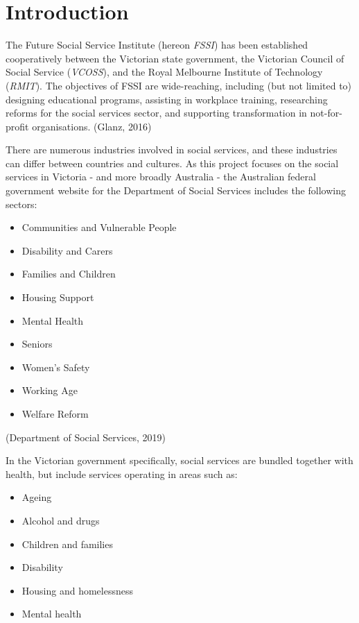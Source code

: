 \documentclass[
  11pt,
]{article}
\providecommand{\tightlist}{%
  \setlength{\itemsep}{0pt}\setlength{\parskip}{0pt}}
\begin{document}
\twocolumn

\hypertarget{introduction}{%
\section{Introduction}\label{introduction}}

The Future Social Service Institute (hereon \emph{FSSI}) has been established cooperatively between the Victorian state government, the Victorian Council of Social Service (\emph{VCOSS}), and the Royal Melbourne Institute of Technology (\emph{RMIT}). The objectives of FSSI are wide-reaching, including (but not limited to) designing educational programs, assisting in workplace training, researching reforms for the social services sector, and supporting transformation in not-for-profit organisations. (Glanz, 2016)

There are numerous industries involved in social services, and these industries can differ between countries and cultures. As this project focuses on the social services in Victoria - and more broadly Australia - the Australian federal government website for the Department of Social Services includes the following sectors:

\begin{itemize}
\tightlist
\item
  Communities and Vulnerable People
\item
  Disability and Carers
\item
  Families and Children
\item
  Housing Support
\item
  Mental Health
\item
  Seniors
\item
  Women's Safety
\item
  Working Age
\item
  Welfare Reform
\end{itemize}

(Department of Social Services, 2019)

In the Victorian government specifically, social services are bundled together with health, but include services operating in areas such as:

\begin{itemize}
\tightlist
\item
  Ageing
\item
  Alcohol and drugs
\item
  Children and families
\item
  Disability
\item
  Housing and homelessness
\item
  Mental health
\end{itemize}
\end{document}
